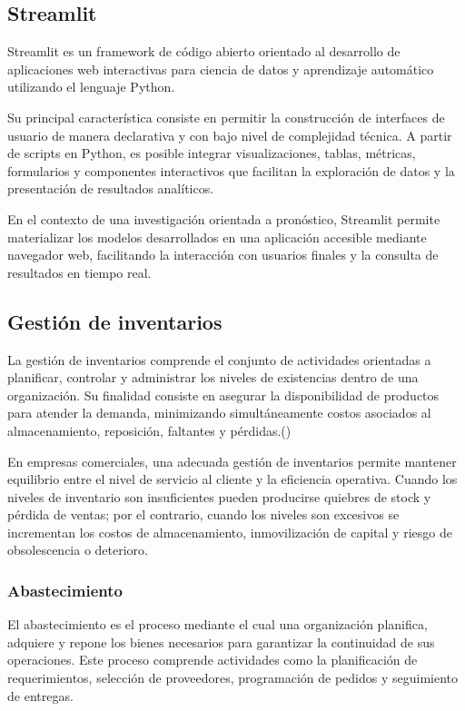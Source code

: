 \subsection{Streamlit}

Streamlit es un framework de código abierto orientado al desarrollo de aplicaciones web interactivas para ciencia de datos y aprendizaje automático utilizando el lenguaje Python.

Su principal característica consiste en permitir la construcción de interfaces de usuario de manera declarativa y con bajo nivel de complejidad técnica. A partir de scripts en Python, es posible integrar visualizaciones, tablas, métricas, formularios y componentes interactivos que facilitan la exploración de datos y la presentación de resultados analíticos.

En el contexto de una investigación orientada a pronóstico, Streamlit permite materializar los modelos desarrollados en una aplicación accesible mediante navegador web, facilitando la interacción con usuarios finales y la consulta de resultados en tiempo real.

\subsection{Gestión de inventarios}

La gestión de inventarios comprende el conjunto de actividades orientadas a planificar, controlar y administrar los niveles de existencias dentro de una organización. Su finalidad consiste en asegurar la disponibilidad de productos para atender la demanda, minimizando simultáneamente costos asociados al almacenamiento, reposición, faltantes y pérdidas.(\cite{chopra2019supply})

En empresas comerciales, una adecuada gestión de inventarios permite mantener equilibrio entre el nivel de servicio al cliente y la eficiencia operativa. Cuando los niveles de inventario son insuficientes pueden producirse quiebres de stock y pérdida de ventas; por el contrario, cuando los niveles son excesivos se incrementan los costos de almacenamiento, inmovilización de capital y riesgo de obsolescencia o deterioro.

\subsubsection{Abastecimiento}

El abastecimiento es el proceso mediante el cual una organización planifica, adquiere y repone los bienes necesarios para garantizar la continuidad de sus operaciones. Este proceso comprende actividades como la planificación de requerimientos, selección de proveedores, programación de pedidos y seguimiento de entregas.

